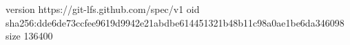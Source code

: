 version https://git-lfs.github.com/spec/v1
oid sha256:dde6de73ccfee9619d9942e21abdbe614451321b48b11c98a0ae1be6da346098
size 136400
